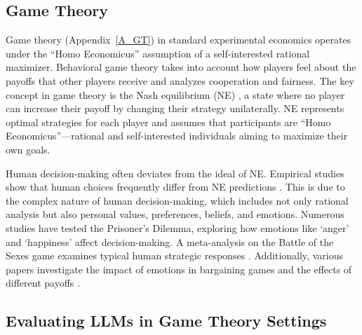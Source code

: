 \documentclass{article}
\begin{document}



\subsection{Game Theory}

Game theory (Appendix~\ref{A_GT}) in standard experimental economics operates under the ``Homo Economicus'' assumption of a self-interested rational maximizer. Behavioral game theory takes into account how players feel about the payoffs that other players receive and analyzes cooperation and fairness. The key concept in game theory is the Nash equilibrium (NE) \cite{chen2023global}, a state where no player can increase their payoff by changing their strategy unilaterally. NE represents optimal strategies for each player and assumes that participants are ``Homo Economicus''—rational and self-interested individuals aiming to maximize their own goals\cite{persky1995}. 

Human decision-making often deviates from the ideal of NE. Empirical studies show that human choices frequently differ from NE predictions \cite{nagel1995}. This is due to the complex nature of human decision-making, which includes not only rational analysis but also personal values, preferences, beliefs, and emotions. Numerous studies have tested the Prisoner's Dilemma, exploring how emotions like `anger' and `happiness' affect decision-making\cite{RePEc:wly:econjl:v:128:y:2018:i:616:p:3182-3209,fpsyg.2013.00469,PROTO2019209}. A meta-analysis on the Battle of the Sexes game examines typical human strategic responses \cite{da5c6981-883c-314e-91a7-25477f099152}. Additionally, various papers investigate the impact of emotions in bargaining games\cite{harle2007incidental, ANDRADE20091, KAUSEL201496, FORGAS201364} and the effects of different payoffs \cite{LARNEY201961}. 


\subsection{Evaluating LLMs in Game Theory Settings}
\end{document}

